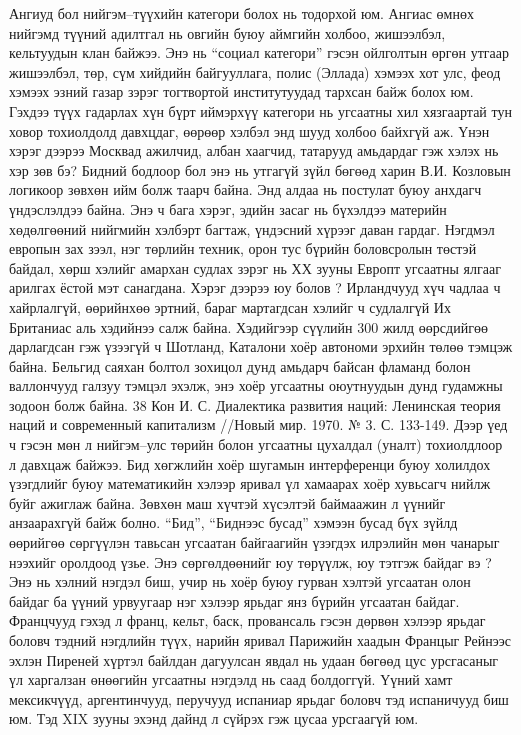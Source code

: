 Ангиуд бол нийгэм–түүхийн категори болох нь тодорхой юм. Ангиас өмнөх нийгэмд түүний адилтгал нь овгийн буюу аймгийн холбоо, жишээлбэл, кельтуудын клан байжээ. Энэ нь “социал категори” гэсэн ойлголтын өргөн утгаар жишээлбэл, төр, сүм хийдийн байгууллага, полис (Эллада) хэмээх хот улс, феод хэмээх эзний газар зэрэг тогтвортой институтуудад тархсан байж болох юм. Гэхдээ түүх гадарлах хүн бүрт иймэрхүү категори нь угсаатны хил хязгаартай тун ховор тохиолдолд давхцдаг, өөрөөр хэлбэл энд шууд холбоо байхгүй аж. Үнэн хэрэг дээрээ Москвад ажилчид, албан хаагчид, татарууд амьдардаг гэж хэлэх нь хэр зөв бэ? Бидний бодлоор бол энэ нь утгагүй зүйл бөгөөд харин В.И. Козловын логикоор зөвхөн ийм болж таарч байна. Энд алдаа нь постулат буюу анхдагч үндэслэлдээ байна. Энэ ч бага хэрэг, эдийн засаг нь бүхэлдээ материйн хөдөлгөөний нийгмийн хэлбэрт багтаж, үндэсний хүрээг даван гардаг. Нэгдмэл европын зах зээл, нэг төрлийн техник, орон тус бүрийн боловсролын төстэй байдал, хөрш хэлийг амархан судлах зэрэг нь ХХ зууны Европт угсаатны ялгааг арилгах ёстой мэт санагдана. Хэрэг дээрээ юу болов ? Ирландчууд хүч чадлаа ч хайрлалгүй, өөрийнхөө эртний, бараг мартагдсан хэлийг ч судлалгүй Их Британиас аль хэдийнээ салж байна. Хэдийгээр сүүлийн 300 жилд өөрсдийгөө дарлагдсан гэж үзээгүй ч Шотланд, Каталони хоёр автономи эрхийн төлөө тэмцэж байна. Бельгид саяхан болтол зохицол дунд амьдарч байсан фламанд болон валлончууд галзуу тэмцэл эхэлж, энэ хоёр угсаатны оюутнуудын дунд гудамжны зодоон болж байна.
38 Кон И. С. Диалектика развития наций: Ленинская теория наций и современный капитализм //Новый мир. 1970. № 3. С. 133-149.
Дээр үед ч гэсэн мөн л нийгэм–улс төрийн болон угсаатны цухалдал (уналт) тохиолдлоор л давхцаж байжээ. Бид хөгжлийн хоёр шугамын интерференци буюу холилдох үзэгдлийг буюу математикийн хэлээр яривал үл хамаарах хоёр хувьсагч нийлж буйг ажиглаж байна. Зөвхөн маш хүчтэй хүсэлтэй баймаажин л үүнийг анзаарахгүй байж болно.
“Бид”, “Биднээс бусад” хэмээн бусад бүх зүйлд өөрийгөө сөргүүлэн тавьсан угсаатан байгаагийн үзэгдэх илрэлийн мөн чанарыг нээхийг оролдоод үзье. Энэ сөргөлдөөнийг юу төрүүлж, юу тэтгэж байдаг вэ ? Энэ нь хэлний нэгдэл биш, учир нь хоёр буюу гурван хэлтэй угсаатан олон байдаг ба үүний урвуугаар нэг хэлээр ярьдаг янз бүрийн угсаатан байдаг. Францчууд гэхэд л франц, кельт, баск, провансаль гэсэн дөрвөн хэлээр ярьдаг боловч тэдний нэгдлийн түүх, нарийн яривал Парижийн хаадын Францыг Рейнээс эхлэн Пиреней хүртэл байлдан дагуулсан явдал нь удаан бөгөөд цус урсгасаныг үл харгалзан өнөөгийн угсаатны нэгдэлд нь саад болдоггүй. Үүний хамт мексикчүүд, аргентинчууд, перучууд испаниар ярьдаг боловч тэд испаничууд биш юм. Тэд XIX зууны эхэнд дайнд л сүйрэх гэж цусаа урсгаагүй юм.
